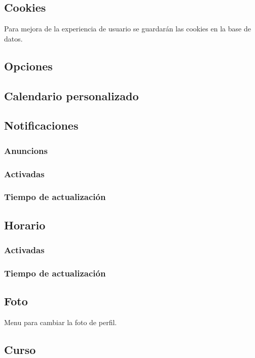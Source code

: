 \documentclass[12pt]{article}
\begin{document}
    \subsection{Cookies}
      Para mejora de la experiencia de usuario se guardar\'{a}n las cookies en la base de
      datos.
    \subsection{Opciones}
      \subsection{Calendario personalizado}
      \subsection{Notificaciones}
        \subsubsection{Anuncions}
          \subsubsection{Activadas}
          \subsubsection{Tiempo de actualizaci\'{o}n}
        \subsection{Horario}
          \subsubsection{Activadas}
          \subsubsection{Tiempo de actualizaci\'{o}n}
      \subsection{Foto}
        Menu para cambiar la foto de perfil.
      \subsection{Curso}
\end{document}
